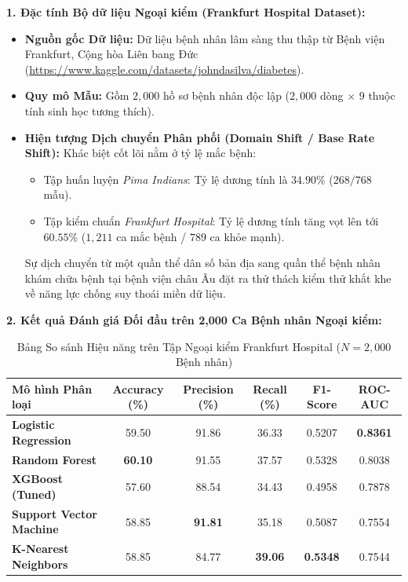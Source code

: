\documentclass[12pt,a4paper]{report}
\begin{document}
\textbf{1. Đặc tính Bộ dữ liệu Ngoại kiểm (Frankfurt Hospital Dataset):}
\begin{itemize}[leftmargin=1.5em]
    \item \textbf{Nguồn gốc Dữ liệu:} Dữ liệu bệnh nhân lâm sàng thu thập từ Bệnh viện Frankfurt, Cộng hòa Liên bang Đức (\url{https://www.kaggle.com/datasets/johndasilva/diabetes}).
    \item \textbf{Quy mô Mẫu:} Gồm $2,000$ hồ sơ bệnh nhân độc lập ($2,000$ dòng $\times$ $9$ thuộc tính sinh học tương thích).
    \item \textbf{Hiện tượng Dịch chuyển Phân phối (Domain Shift / Base Rate Shift):} Khác biệt cốt lõi nằm ở tỷ lệ mắc bệnh:
    \begin{itemize}[leftmargin=1.2em]
        \item Tập huấn luyện \textit{Pima Indians}: Tỷ lệ dương tính là $34.90\%$ ($268 / 768$ mẫu).
        \item Tập kiểm chuẩn \textit{Frankfurt Hospital}: Tỷ lệ dương tính tăng vọt lên tới \textbf{$60.55\%$} ($1,211$ ca mắc bệnh / $789$ ca khỏe mạnh).
    \end{itemize}
    Sự dịch chuyển từ một quần thể dân số bản địa sang quần thể bệnh nhân khám chữa bệnh tại bệnh viện châu Âu đặt ra thử thách kiểm thử khắt khe về năng lực chống suy thoái miền dữ liệu.
\end{itemize}

\textbf{2. Kết quả Đánh giá Đối đầu trên 2,000 Ca Bệnh nhân Ngoại kiểm:}

\begin{table}[H]
\centering
\small
\begin{tabular}{lccccc}
\toprule
\textbf{Mô hình Phân loại} & \textbf{Accuracy (\%)} & \textbf{Precision (\%)} & \textbf{Recall (\%)} & \textbf{F1-Score} & \textbf{ROC-AUC} \\
\midrule
\textbf{Logistic Regression} & 59.50 & 91.86 & 36.33 & 0.5207 & \textbf{0.8361} \\
\textbf{Random Forest} & \textbf{60.10} & 91.55 & 37.57 & 0.5328 & 0.8038 \\
\textbf{XGBoost (Tuned)} & 57.60 & 88.54 & 34.43 & 0.4958 & 0.7878 \\
\textbf{Support Vector Machine} & 58.85 & \textbf{91.81} & 35.18 & 0.5087 & 0.7554 \\
\textbf{K-Nearest Neighbors} & 58.85 & 84.77 & \textbf{39.06} & \textbf{0.5348} & 0.7544 \\
\bottomrule
\end{tabular}
\caption{Bảng So sánh Hiệu năng trên Tập Ngoại kiểm Frankfurt Hospital ($N=2,000$ Bệnh nhân)}
\label{tab:week1_external_results}
\end{table}
\end{document}
